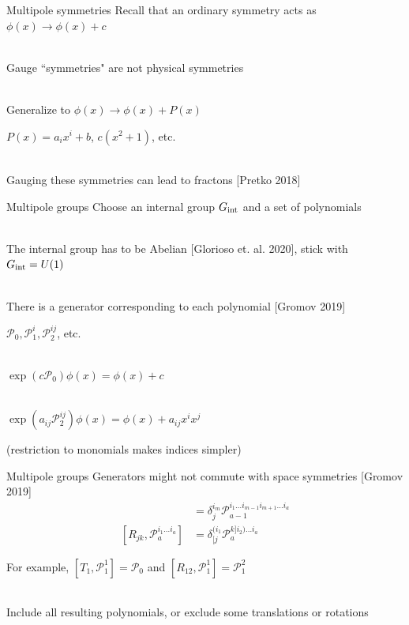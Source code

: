 \documentclass{beamer}
\renewcommand{\P}{\mathcal{P}}
\begin{document}
\begin{frame}{Multipole symmetries}
Recall that an ordinary symmetry acts as $\phi(x) \rightarrow \phi(x) + c$\\\

Gauge ``symmetries" are not physical symmetries\\\

Generalize to $\phi(x) \rightarrow \phi(x) + P(x)$

\setlength{\leftskip}{1cm}

$P(x) = a_ix^i + b$, $c(x^2+1)$, etc.\\\

\setlength{\leftskip}{0cm}

Gauging these symmetries can lead to fractons [Pretko 2018]
\end{frame}

\begin{frame}{Multipole groups}
Choose an internal group $G_{\rm int}$ and a set of polynomials\\\

The internal group has to be Abelian [Glorioso et. al. 2020], stick with $G_{\rm int}=U(1)$\\\

There is a generator corresponding to each polynomial [Gromov 2019]

\setlength{\leftskip}{1cm}

$\mathcal{P}_0, \P_1^i, \P_2^{ij}$, etc.\\\

$\exp(c \P_0) \phi(x) = \phi(x) +c$\\\

$\exp (a_{ij} \P_2^{ij}) \phi(x) = \phi(x) + a_{ij} x^i x^j$\\

\setlength{\leftskip}{0cm}

\small (restriction to monomials makes indices simpler)
\end{frame}

\begin{frame}{Multipole groups}
Generators might not commute with space symmetries [Gromov 2019]
\begin{align*}
[T_j, \P_a^{i_1\dots i_a}] &= \delta^{i_m}_j \P_{a-1} ^{i_1\dots i_{m-1}i_{m+1}\dots i_a}\\
[R_{jk}, \P^{i_1\dots i_a}_a] &= \delta_{[j}^{(i_1} \P^{k]i_2)\dots i_a}_a
\end{align*}

For example, $[T_1,\P_1^1] = \P_0$ and $[R_{12}, \P_1^1] = \P_1^2$\\\

Include all resulting polynomials, or exclude some translations or rotations
\end{frame}
\end{document}
